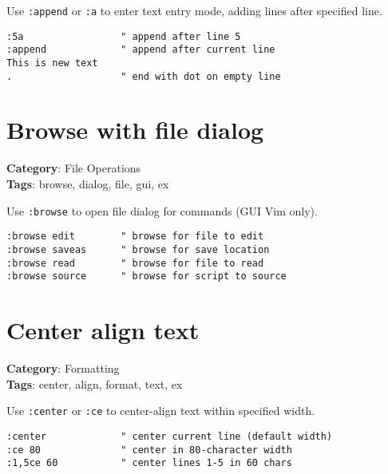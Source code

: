 {{{{{Use {\footnotesize \Verb§:append§} or {\footnotesize \Verb§:a§} to enter text entry mode, adding lines after specified line.

\begin{Exa*}{}
\begin{Verbatim}[fontsize=\footnotesize, breaklines, breakanywhere]
:5a                 " append after line 5
:append             " append after current line
This is new text
.                   " end with dot on empty line
\end{Verbatim}
\end{Exa*}

\section{Browse with file dialog}

\textbf{Category}: File Operations\\ \textbf{Tags}: browse, dialog, file, gui, ex
\vspace{0.5cm}

Use {\footnotesize \Verb§:browse§} to open file dialog for commands (GUI Vim only).

\begin{Exa*}{}
\begin{Verbatim}[fontsize=\footnotesize, breaklines, breakanywhere]
:browse edit        " browse for file to edit
:browse saveas      " browse for save location
:browse read        " browse for file to read
:browse source      " browse for script to source
\end{Verbatim}
\end{Exa*}

\section{Center align text}

\textbf{Category}: Formatting\\ \textbf{Tags}: center, align, format, text, ex
\vspace{0.5cm}

Use {\footnotesize \Verb§:center§} or {\footnotesize \Verb§:ce§} to center-align text within specified width.

\begin{Exa*}{}
\begin{Verbatim}[fontsize=\footnotesize, breaklines, breakanywhere]
:center             " center current line (default width)
:ce 80              " center in 80-character width
:1,5ce 60           " center lines 1-5 in 60 chars
\end{Verbatim}
\end{Exa*}

}}}}}
